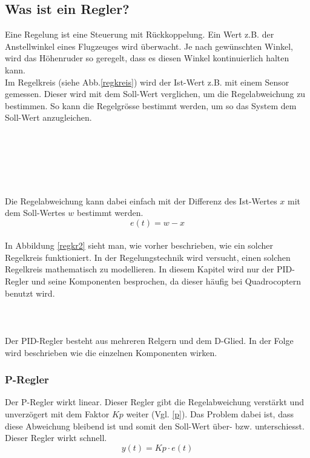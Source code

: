 \documentclass[12pt,a4paper, ngerman]{article}
\begin{document}
\subsection{Was ist ein Regler?}
Eine Regelung ist eine Steuerung mit Rückkoppelung\cite{website:rn-wissen_Regelungstechnik}. Ein Wert z.B. der Anstellwinkel eines Flugzeuges wird überwacht. Je nach gewünschten Winkel, wird das Höhenruder so geregelt, dass es diesen Winkel kontinuierlich halten kann.\\
Im Regelkreis (siehe Abb.\ref{regkreis}) wird der Ist-Wert z.B. mit einem Sensor gemessen. Dieser wird mit dem Soll-Wert verglichen, um die Regelabweichung zu bestimmen. So kann die Regelgrösse bestimmt werden, um so das System dem Soll-Wert anzugleichen\cite{website:rn-wissen_Regelungstechnik}.\\ \\ \\ \\ \\ \\ \\
Die Regelabweichung kann dabei einfach mit der Differenz des Ist-Wertes $x$ mit dem Soll-Wertes $w$ bestimmt werden\cite{website:rn-wissen_Regelungstechnik}.
\begin{equation}
e(t)=w-x
\end{equation}\\

\noindent
In Abbildung \ref{regkr2} sieht man, wie vorher beschrieben, wie ein solcher Regelkreis funktioniert. In der Regelungstechnik wird versucht, einen solchen Regelkreis mathematisch zu modellieren. In diesem Kapitel wird nur der PID-Regler und seine Komponenten besprochen, da dieser häufig bei Quadrocoptern benutzt wird\cite{website:rn-wissen_Regelungstechnik}.
\\ \\ \\ \\
Der PID-Regler besteht aus mehreren Relgern und dem D-Glied. In der Folge wird beschrieben wie die einzelnen Komponenten wirken. 

\subsubsection{P-Regler}
Der P-Regler wirkt linear. Dieser Regler gibt die Regelabweichung verstärkt und unverzögert mit dem Faktor $Kp$ weiter (Vgl. \ref{p}). Das Problem dabei ist, dass diese Abweichung bleibend ist und somit den Soll-Wert über- bzw. unterschiesst. Dieser Regler wirkt schnell\cite{website:rn-wissen_Regelungstechnik}.
\begin{equation}\label{p}
y(t)=Kp\cdot e(t)
\end{equation}
\newpage
\end{document}
